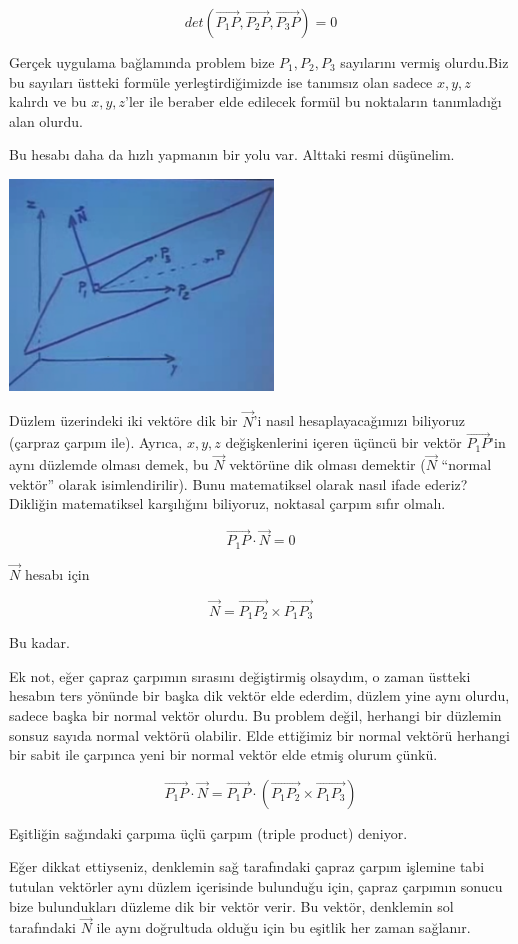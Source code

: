 \documentclass[12pt,fleqn]{article}\usepackage{../../common}
\begin{document}
$$ det(\vec{P_1P},\vec{P_2P},\vec{P_3P}) = 0 $$

Gerçek uygulama bağlamında problem bize $P_1,P_2,P_3$ sayılarını vermiş
olurdu.Biz bu sayıları üstteki formüle yerleştirdiğimizde ise tanımsız olan
sadece $x,y,z$ kalırdı ve bu $x,y,z$'ler ile beraber elde edilecek formül bu
noktaların tanımladığı alan olurdu.

Bu hesabı daha da hızlı yapmanın bir yolu var. Alttaki resmi
düşünelim.

\includegraphics[width=7cm]{3_3.png}

Düzlem üzerindeki iki vektöre dik bir $\vec{N}$'i nasıl hesaplayacağımızı
biliyoruz (çarpraz çarpım ile).  Ayrıca, $x,y,z$ değişkenlerini içeren üçüncü
bir vektör $\vec{P_1P}$'in aynı düzlemde olması demek, bu $\vec{N}$ vektörüne
dik olması demektir ($\vec{N}$ ``normal vektör'' olarak isimlendirilir). Bunu
matematiksel olarak nasıl ifade ederiz? Dikliğin matematiksel karşılığını
biliyoruz, noktasal çarpım sıfır olmalı.

$$ \vec{P_1P} \cdot \vec{N} = 0 $$

$\vec{N}$ hesabı için

$$ \vec{N} = \vec{P_1P_2} \times \vec{P_1P_3}$$

Bu kadar.

Ek not, eğer çapraz çarpımın sırasını değiştirmiş olsaydım, o zaman üstteki
hesabın ters yönünde bir başka dik vektör elde ederdim, düzlem yine aynı olurdu,
sadece başka bir normal vektör olurdu. Bu problem değil, herhangi bir düzlemin
sonsuz sayıda normal vektörü olabilir. Elde ettiğimiz bir normal vektörü
herhangi bir sabit ile çarpınca yeni bir normal vektör elde etmiş olurum çünkü.

$$ \vec{P_1P} \cdot \vec{N} =
\vec{P_1P} \cdot (\vec{P_1P_2} \times \vec{P_1P_3})
$$

Eşitliğin sağındaki çarpıma üçlü çarpım (triple product) deniyor.

Eğer dikkat ettiyseniz, denklemin sağ tarafındaki çapraz çarpım işlemine tabi
tutulan vektörler aynı düzlem içerisinde bulunduğu için, çapraz çarpımın sonucu
bize bulundukları düzleme dik bir vektör verir. Bu vektör, denklemin sol
tarafındaki $\vec{N}$ ile aynı doğrultuda olduğu için bu eşitlik her zaman
sağlanır.
\end{document}
